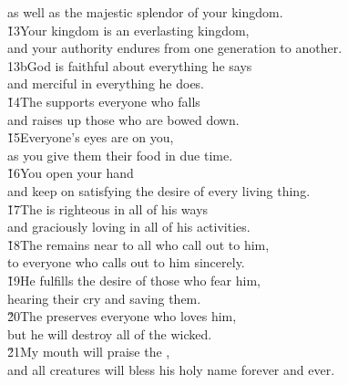 \begin{poetry}
\poemll    as well as the majestic splendor of your kingdom. \\
\poeml \v{13}Your kingdom is an everlasting kingdom, \\
\poemll    and your authority endures from one generation to another. \\
\poeml 13bGod is faithful about everything he says \\
\poemll    and merciful in everything he does. \\
\poeml \v{14}The  supports everyone who falls \\
\poemll    and raises up those who are bowed down. \\
\poeml \v{15}Everyone's eyes are on you, \\
\poemll    as you give them their food in due time. \\
\poeml \v{16}You open your hand \\
\poemll    and keep on satisfying the desire of every living thing. \\
\poeml \v{17}The  is righteous in all of his ways \\
\poemll    and graciously loving in all of his activities. \\
\poeml \v{18}The  remains near to all who call out to him, \\
\poemll    to everyone who calls out to him sincerely. \\
\poeml \v{19}He fulfills the desire of those who fear him, \\
\poemll    hearing their cry and saving them. \\
\poeml \v{20}The  preserves everyone who loves him, \\
\poemll    but he will destroy all of the wicked. \\
\poeml \v{21}My mouth will praise the , \\
\poemll    and all creatures will bless his holy name forever and ever.
\end{poetry}

